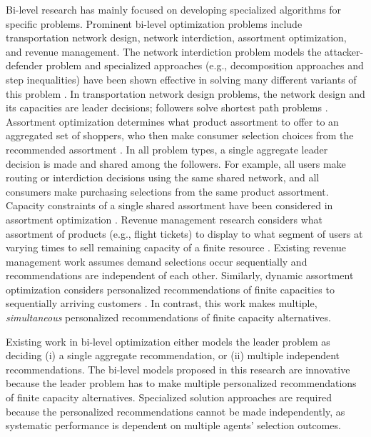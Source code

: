 \documentclass[11pt, letterpaper]{article}
\begin{document}
Bi-level research has mainly focused on developing specialized algorithms for specific problems.  Prominent bi-level optimization problems include transportation network design, network interdiction, assortment optimization, and revenue management. The network interdiction problem models the attacker-defender problem and specialized approaches (e.g., decomposition approaches and step inequalities) have been shown effective in solving many different variants of this problem \cite{delgadillo2010analysis, lim2007algorithms, scaparra2008bilevel, sullivan2014convex}. In transportation network design problems, the network design and its capacities are leader decisions; followers solve shortest path problems \cite{brotcorne2001bilevel, farahani2013review, gao2005solution,  marcotte1986network}. Assortment optimization determines what product assortment to offer to an aggregated set of shoppers, who then make consumer selection choices from the recommended assortment \cite{kok2015assortment}. In all problem types, a single aggregate leader decision is made and shared among the followers.   For example, all users make routing or interdiction decisions using the same shared network, and all consumers make purchasing selections from the same product assortment.  Capacity constraints of a single shared assortment have been considered in assortment optimization \cite{feldman2015capacity, gallego2014constrained, rusmevichientong2010dynamic}.     
Revenue management research considers what assortment of products (e.g., flight tickets) to display to what segment of users at varying times to sell remaining capacity of a finite resource \cite{gallego2014general, kunnumkal2010new,   zhang2009approximate, zhang2005revenue}.  Existing revenue management work assumes demand selections occur sequentially and recommendations are independent of each other. Similarly, dynamic assortment optimization considers personalized recommendations of finite capacities to sequentially arriving customers \cite{bernstein2015dynamic, johari2016know, saure2013optimal, topaloglu2013joint}. In contrast, this work makes multiple, \emph{simultaneous} personalized recommendations of finite capacity alternatives. 


Existing work in bi-level optimization either models the leader problem as deciding (i) a single aggregate recommendation, or (ii) multiple independent recommendations. The bi-level models proposed in this research are innovative because the leader problem has to make multiple personalized recommendations of finite capacity alternatives.  Specialized solution approaches are required because the personalized recommendations  cannot be made independently, as systematic performance is dependent on multiple agents' selection outcomes.     
\end{document}

